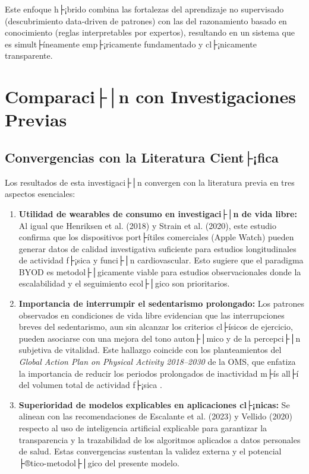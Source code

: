 Este enfoque h├¡brido combina las fortalezas del aprendizaje no supervisado (descubrimiento data-driven de patrones) con las del razonamiento basado en conocimiento (reglas interpretables por expertos), resultando en un sistema que es simult├íneamente emp├¡ricamente fundamentado y cl├¡nicamente transparente.


\section{Comparaci├│n con Investigaciones Previas}
\label{sec:comparacion_investigaciones}

\subsection{Convergencias con la Literatura Cient├¡fica}
\label{subsec:convergencias}

Los resultados de esta investigaci├│n convergen con la literatura previa en tres aspectos esenciales:

\begin{enumerate}
    \item \textbf{Utilidad de wearables de consumo en investigaci├│n de vida libre:} Al igual que Henriksen et al. (2018) y Strain et al. (2020), este estudio confirma que los dispositivos port├ítiles comerciales (Apple Watch) pueden generar datos de calidad investigativa suficiente para estudios longitudinales de actividad f├¡sica y funci├│n cardiovascular. Esto sugiere que el paradigma BYOD es metodol├│gicamente viable para estudios observacionales donde la escalabilidad y el seguimiento ecol├│gico son prioritarios.
    
    \item \textbf{Importancia de interrumpir el sedentarismo prolongado:} Los patrones observados en condiciones de vida libre evidencian que las interrupciones breves del sedentarismo, aun sin alcanzar los criterios cl├ísicos de ejercicio, pueden asociarse con una mejora del tono auton├│mico y de la percepci├│n subjetiva de vitalidad. Este hallazgo coincide con los planteamientos del \textit{Global Action Plan on Physical Activity 2018--2030} de la OMS, que enfatiza la importancia de reducir los periodos prolongados de inactividad m├ís all├í del volumen total de actividad f├¡sica \cite{WHO2018,Bull2020}.
    
    \item \textbf{Superioridad de modelos explicables en aplicaciones cl├¡nicas:} Se alinean con las recomendaciones de Escalante et al. (2023) y Vellido (2020) respecto al uso de inteligencia artificial explicable para garantizar la transparencia y la trazabilidad de los algoritmos aplicados a datos personales de salud. Estas convergencias sustentan la validez externa y el potencial ├®tico-metodol├│gico del presente modelo.
\end{enumerate}

